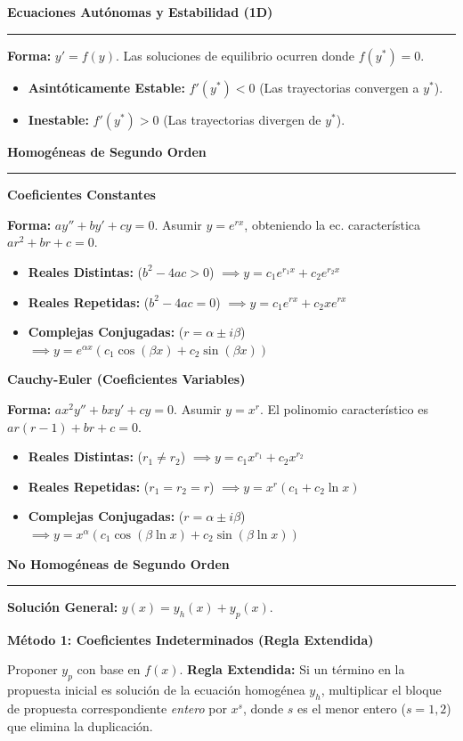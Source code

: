 \documentclass[10pt, landscape, twocolumn]{article}
\newcommand{\cheatsheetsection}[1]{
    \vspace{0.6em}
    {\color{themeblue}\large\bfseries #1} \par
    \vspace{-0.5em}
    {\color{themeblue}\rule{\linewidth}{1pt}} \par
    \vspace{0.2em}
}
\newcommand{\cheatsheetsubsection}[1]{
    \vspace{0.4em}
    {\color{themeblue}\normalsize\bfseries #1} \par
    \vspace{0.1em}
}
\begin{document}
\cheatsheetsection{Ecuaciones Autónomas y Estabilidad (1D)}
\textbf{Forma:} $y' = f(y)$. Las soluciones de equilibrio ocurren donde $f(y^*) = 0$.
\begin{itemize}[leftmargin=*, nosep]
    \item \textbf{Asintóticamente Estable:} $f'(y^*) < 0$ (Las trayectorias convergen a $y^*$).
    \item \textbf{Inestable:} $f'(y^*) > 0$ (Las trayectorias divergen de $y^*$).
\end{itemize}

\newpage
\cheatsheetsection{Homogéneas de Segundo Orden}

\cheatsheetsubsection{Coeficientes Constantes}
\textbf{Forma:} $ay'' + by' + cy = 0$. Asumir $y = e^{rx}$, obteniendo la ec. característica $ar^2 + br + c = 0$.
\begin{itemize}[leftmargin=*, nosep]
    \item \textbf{Reales Distintas:} ($b^2 - 4ac > 0$) $\implies y = c_1 e^{r_1 x} + c_2 e^{r_2 x}$
    \item \textbf{Reales Repetidas:} ($b^2 - 4ac = 0$) $\implies y = c_1 e^{r x} + c_2 x e^{r x}$
    \item \textbf{Complejas Conjugadas:} ($r = \alpha \pm i\beta$) $\implies y = e^{\alpha x} (c_1 \cos(\beta x) + c_2 \sin(\beta x))$
\end{itemize}

\cheatsheetsubsection{Cauchy-Euler (Coeficientes Variables)}
\textbf{Forma:} $ax^2y'' + bxy' + cy = 0$. Asumir $y = x^r$. El polinomio característico es $ar(r-1) + br + c = 0$.
\begin{itemize}[leftmargin=*, nosep]
    \item \textbf{Reales Distintas:} ($r_1 \neq r_2$) $\implies y = c_1 x^{r_1} + c_2 x^{r_2}$
    \item \textbf{Reales Repetidas:} ($r_1 = r_2 = r$) $\implies y = x^r (c_1 + c_2 \ln x)$
    \item \textbf{Complejas Conjugadas:} ($r = \alpha \pm i\beta$) $\implies y = x^\alpha (c_1 \cos(\beta \ln x) + c_2 \sin(\beta \ln x))$
\end{itemize}

\cheatsheetsection{No Homogéneas de Segundo Orden}
\textbf{Solución General:} $y(x) = y_h(x) + y_p(x)$.

\cheatsheetsubsection{Método 1: Coeficientes Indeterminados (Regla Extendida)}
Proponer $y_p$ con base en $f(x)$. \textbf{Regla Extendida:} Si un término en la propuesta inicial es solución de la ecuación homogénea $y_h$, multiplicar el bloque de propuesta correspondiente \textit{entero} por $x^s$, donde $s$ es el menor entero ($s=1, 2$) que elimina la duplicación.
\end{document}
